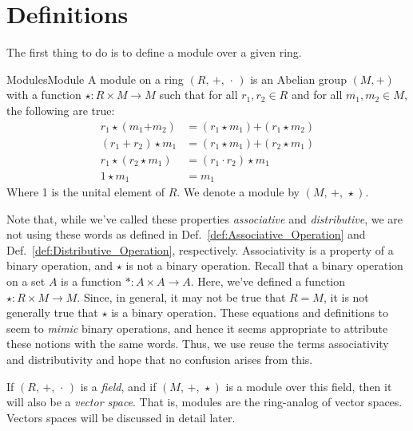 \section{Definitions}
    The first thing to do is to define a module over a given ring.
    \begin{fdefinition}{Modules}{Module}
        A \gls{module} on a \gls{ring} $(R,\,+,\,\cdot\,)$ is an
        \gls{Abelian group} $(M,\boldsymbol{+})$ with a \gls{function}
        $\star:R\times{M}\rightarrow{M}$ such that for all $r_{1},r_{2}\in{R}$
        and for all $m_{1},m_{2}\in{M}$, the following are true:
        \begin{align}
            r_{1}\star(m_{1}\boldsymbol{+}m_{2})
                &=(r_{1}\star{m}_{1})\boldsymbol{+}(r_{1}\star{m}_{2})
                \tag{Scalar Distributivity}\\
            (r_{1}+r_{2})\star{m}_{1}
                &=(r_{1}\star{m}_{1})\boldsymbol{+}(r_{2}\star{m}_{1})
                \tag{Module Distributivity}\\
            r_{1}\star(r_{2}\star{m}_{1})
                &=(r_{1}\cdot{r}_{2})\star{m}_{1}
                \tag{Associativity}\\
            1\star{m}_{1}&=m_{1}
            \tag{Identity}
        \end{align}
        Where 1 is the unital element of $R$. We denote a module by
        $(M,\,\boldsymbol{+},\,\star)$.
    \end{fdefinition}
    Note that, while we've called these properties \textit{associative} and
    \textit{distributive}, we are not using these words as defined in
    Def.~\ref{def:Associative_Operation} and
    Def.~\ref{def:Distributive_Operation}, respectively.
    Associativity is a property of a binary operation, and $\star$ is not a
    binary operation. Recall that a binary operation on a set $A$ is a function
    $*:A\times{A}\rightarrow{A}$. Here, we've defined a function
    $\star:R\times{M}\rightarrow{M}$. Since, in general, it may not be true that
    $R=M$, it is not generally true that $\star$ is a binary operation. These
    equations and definitions to seem to \textit{mimic} binary operations, and
    hence it seems appropriate to attribute these notions with the same words.
    Thus, we use reuse the terms associativity and distributivity and hope that
    no confusion arises from this.
    \begin{example}
        If $(R,\,+,\,\cdot\,)$ is a \textit{field}, and if
        $(M,\,\boldsymbol{+},\,\star)$ is a module over this field, then it will
        also be a \textit{vector space}. That is, modules
        are the ring-analog of vector spaces. Vectors spaces will be discussed
        in detail later.
    \end{example}
